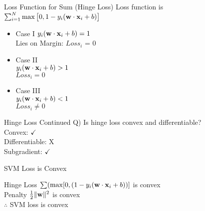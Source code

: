 \documentclass{beamer}
\begin{document}
{
	
}

	\begin{frame}{Loss Function for Sum (Hinge Loss)}
		Loss function is $\sum_{i=1}^{N}\max\big[0, 1 - y_{i}(\mathbf{w} \cdot \mathbf{x}_{i} + b)\big]$ \\
		\begin{itemize}[<+->]
			\item Case I 
			\hspace{0.5cm} $y_{i}(\mathbf{w} \cdot \mathbf{x}_{i} + b) = 1$ \\
			
			Lies on Margin: $Loss_{i}$ = 0 \\
		
			\item Case II \\
			\hspace{0.5cm} $y_{i}(\mathbf{w} \cdot \mathbf{x}_{i} + b) > 1$ \\
			$Loss_{i} = 0$ \\ 
			
			\item 	Case III \\
			\hspace{0.5cm} $y_{i}(\mathbf{w} \cdot \mathbf{x}_{i} + b) < 1$ \\
			$Loss_{i} \neq 0$
		\end{itemize}
		
		
	
	\end{frame}
	\begin{frame}{Hinge Loss Continued}
		Q) Is hinge loss convex and differentiable? \\
		\hspace{0.5cm}Convex: $\checkmark$ \\
		\hspace{0.5cm}Differentiable: X\\
		\hspace{0.5cm}Subgradient: $\checkmark$
	\end{frame}
	\begin{frame}{SVM Loss is Convex}
		
		Hinge Loss $\sum(\max[0, (1-y_{i}(\mathbf{w} \cdot \mathbf{x}_{i}+b))]$ is convex \\
		\vspace{1cm}
		Penalty $\frac{1}{2}\|\mathbf{w}\|^{2}$ is convex \\
		\vspace{1cm}
		$\therefore$ SVM loss is convex
	\end{frame}
	
\end{document}
